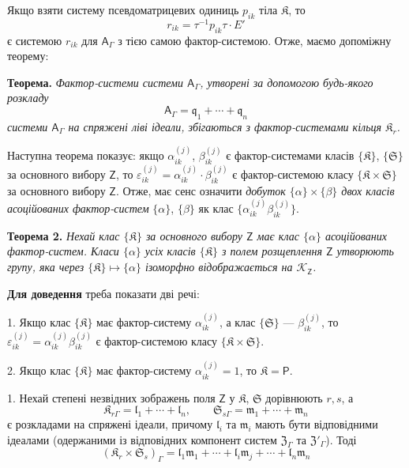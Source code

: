 \documentclass[11pt]{article}
\begin{document}
Якщо взяти систему псевдоматрицевих одиниць \(p_{ik}\) тіла \(\mathfrak K\), то
\[
r_{ik}=\tau^{-1}p_{ik}\tau\cdot E'
\]
є системою \(r_{ik}\) для \(\mathsf{A}_\Gamma\) з тією самою фактор-системою. Отже, маємо допоміжну теорему:

\textbf{Теорема.} \emph{Фактор-системи системи \(\mathsf{A}_\Gamma\), утворені за допомогою будь-якого розкладу}
\[
\mathsf{A}_\Gamma=\mathfrak q_1+\cdots+\mathfrak q_n
\]
\emph{системи \(\mathsf{A}_\Gamma\) на спряжені ліві ідеали, збігаються з фактор-системами кільця \(\mathfrak K_r\).}

Наступна теорема показує: якщо \(\alpha_{ik}^{(j)}\), \(\beta_{ik}^{(j)}\) є фактор-системами класів \(\{\mathfrak K\}\), \(\{\mathfrak S\}\) за основного вибору \(\mathsf{Z}\), то \(\varepsilon_{ik}^{(j)}=\alpha_{ik}^{(j)}\cdot\beta_{ik}^{(j)}\) є фактор-системою класу \(\{\mathfrak K\times\mathfrak S\}\) за основного вибору \(\mathsf{Z}\). Отже, має сенс означити \emph{добуток \(\{\alpha\}\times\{\beta\}\) двох класів асоційованих фактор-систем} \(\{\alpha\}\), \(\{\beta\}\) як клас \(\{\alpha_{ik}^{(j)}\beta_{ik}^{(j)}\}\).

\textbf{Теорема 2.} \emph{Нехай клас \(\{\mathfrak K\}\) за основного вибору \(\mathsf{Z}\) має клас \(\{\alpha\}\) асоційованих фактор-систем. Класи \(\{\alpha\}\) усіх класів \(\{\mathfrak K\}\) з полем розщеплення \(\mathsf{Z}\) утворюють групу, яка через \(\{\mathfrak K\}\mapsto\{\alpha\}\) ізоморфно відображається на \(\mathscr K_{\mathsf{Z}}\).}

\textbf{Для доведення} треба показати дві речі:

1. Якщо клас \(\{\mathfrak K\}\) має фактор-систему \(\alpha_{ik}^{(j)}\), а клас \(\{\mathfrak S\}\) --- \(\beta_{ik}^{(j)}\), то \(\varepsilon_{ik}^{(j)}=\alpha_{ik}^{(j)}\beta_{ik}^{(j)}\) є фактор-системою класу \(\{\mathfrak K\times\mathfrak S\}\).

2. Якщо клас \(\{\mathfrak K\}\) має фактор-систему \(\alpha_{ik}^{(j)}=1\), то \(\mathfrak K=\mathsf P\).

1. Нехай степені незвідних зображень поля \(\mathsf{Z}\) у \(\mathfrak K\), \(\mathfrak S\) дорівнюють \(r,s\), а
\[
\mathfrak K_{r\Gamma}=\mathfrak l_1+\cdots+\mathfrak l_n,\qquad
\mathfrak S_{s\Gamma}=\mathfrak m_1+\cdots+\mathfrak m_n
\]
є розкладами на спряжені ідеали, причому \(\mathfrak l_i\) та \(\mathfrak m_i\) мають бути відповідними ідеалами (одержаними із відповідних компонент систем \(\mathfrak Z_\Gamma\) та \(\mathfrak Z'_\Gamma\)). Тоді
\[
(\mathfrak K_r\times\mathfrak S_s)_\Gamma
=\mathfrak l_1\mathfrak m_1+\cdots+\mathfrak l_i\mathfrak m_j+\cdots+\mathfrak l_n\mathfrak m_n
\]
\end{document}
